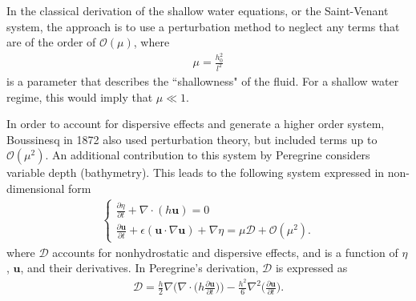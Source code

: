 In the classical derivation of the shallow water equations, or the Saint-Venant system, the approach is to use a perturbation method to neglect any terms that are of the order of $\mathcal{O}(\mu)$, where
\begin{align}
\mu = \frac{h_0^2}{l^2}
\end{align}
is a parameter that describes the ``shallowness" of the fluid. For a shallow water regime, this would imply that $\mu \ll 1$.

In order to account for dispersive effects and generate a higher order system, Boussinesq in 1872 \citep{boussinesq1872theorie} also used perturbation theory, but included terms up to $\mathcal{O}(\mu^2)$. An additional contribution to this system by Peregrine \citep{peregrine1967long} considers variable depth (bathymetry). This leads to the following system expressed in non-dimensional form
\begin{align}
    \begin{cases}
        \frac{\partial \eta}{\partial t} + \nabla \cdot (h \textbf{u}) = 0 \\
        \frac{\partial \textbf{u}}{\partial t} + \epsilon (\textbf{u} \cdot \nabla \textbf{u}) + \nabla \eta = \mu \mathcal{D} + \mathcal{O}(\mu^2).
    \end{cases}
\label{boussinesq_model}
\end{align}
where $\mathcal{D}$ accounts for nonhydrostatic and dispersive effects, and is a function of $\eta$, $\textbf{u}$, and their derivatives. In Peregrine's derivation, $\mathcal{D}$ is expressed as
\begin{align}
\mathcal{D} = \frac{h}{2} \nabla \Big( \nabla \cdot \big( h \frac{\partial \textbf{u}}{\partial t} \big) \Big) - \frac{h^2}{6} \nabla^2 \Big( \frac{\partial \textbf{u}}{\partial t} \Big).
\end{align}

